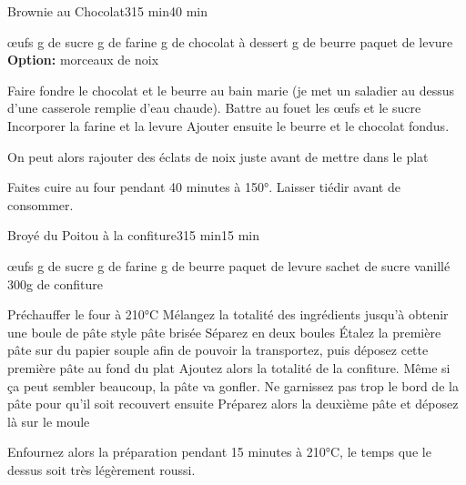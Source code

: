 \begin{recette}{Brownie au Chocolat}{3}{15 min}{40 min}
\begin{ingredients}
 œufs
 g de sucre
 g de farine
 g de chocolat à dessert
 g de beurre
 paquet de levure
\ingredient \textbf{Option: } morceaux de noix
\end{ingredients}

\begin{preparation}
\etape Faire fondre le chocolat et le beurre au bain marie (je met un saladier au dessus d'une casserole remplie d'eau chaude).
\etape Battre au fouet les œufs et le sucre
\etape Incorporer la farine et la levure
\etape Ajouter ensuite le beurre et le chocolat fondus.
\begin{remarque}
On peut alors rajouter des éclats de noix juste avant de mettre dans le plat
\end{remarque}

\end{preparation}

\begin{cuisson}
Faites cuire au four pendant 40 minutes à 150°.
Laisser tiédir avant de consommer. 
\end{cuisson}
\end{recette}

\begin{recette}{Broyé du Poitou à la confiture}{3}{15 min}{15 min}
\begin{ingredients}
 œufs
 g de sucre
 g de farine
 g de beurre
 paquet de levure
 sachet de sucre vanillé
\ingredient 300g de confiture
\end{ingredients}

\begin{preparation}
\etape Préchauffer le four à 210°C
\etape Mélangez la totalité des ingrédients jusqu'à obtenir une boule de pâte style pâte brisée
\etape Séparez en deux boules
\etape Étalez la première pâte sur du papier souple afin de pouvoir la transportez, puis déposez cette première pâte au fond du 
plat
\etape Ajoutez alors la totalité de la confiture. Même si ça peut sembler beaucoup, la pâte va gonfler. Ne garnissez pas trop 
le bord de la pâte pour qu'il soit recouvert ensuite
\etape Préparez alors la deuxième pâte et déposez là sur le moule

\end{preparation}

\begin{cuisson}
Enfournez alors la préparation pendant 15 minutes à 210°C, le temps que le dessus soit très légèrement roussi.
\end{cuisson}
\end{recette}

